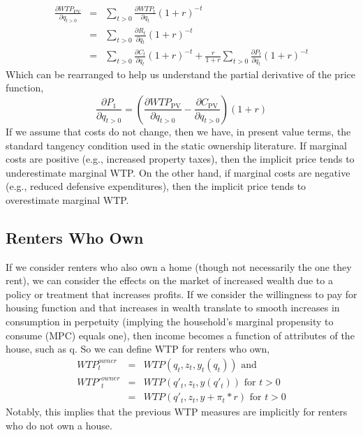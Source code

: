 \documentclass[ecta,nameyear,draft]{econsocart}
\theoremstyle{plain}
\theoremstyle{remark}
\begin{document}
\begin{eqnarray}
\frac{\partial \mathit{WTP}_{\mathrm{PV}}}{\partial q_{t>0}}&=&\sum_{t>0} \frac{\partial \mathit{WTP}_t}{\partial q_t}(1+r)^{-t}\\ \label{pvmwtp}
&=&\sum_{t>0} \frac{\partial R_t}{\partial q_t}(1+r)^{-t}\nonumber\\
&=&\sum_{t>0} \frac{\partial C_t}{\partial q_t}(1+r)^{-t}+\frac{r}{1+r}\sum_{t>0} \frac{\partial P_t}{\partial q_t}(1+r)^{-t}\nonumber
\end{eqnarray}
Which can be rearranged to help us understand the partial derivative of the price function,
\begin{equation}
	\frac{\partial P_1} {\partial q_{t>0}}=\left(\frac{\partial \mathit{WTP}_{\mathrm{PV}}}{\partial q_{t>0}}-\frac{\partial C_{\mathrm{PV}}}{\partial q_{t>0}}\right)(1+r) \label{marginalPrice}
\end{equation}
If we assume that costs do not change, then we have, in present value terms, the standard tangency condition used in the static ownership literature. If marginal costs are positive (e.g., increased property taxes), then the implicit price tends to underestimate marginal WTP. On the other hand, if marginal costs are negative (e.g., reduced defensive expenditures), then the implicit price tends to overestimate marginal WTP.

\subsection{Renters Who Own}
If we consider renters who also own a home (though not necessarily the one they rent), we can consider the effects on the market of increased wealth due to a policy or treatment that increases profits. If we consider the willingness to pay for housing function and that increases in wealth translate to smooth increases in consumption in perpetuity (implying the household's marginal propensity to consume (MPC) equals one), then income becomes a function of attributes of the house, such as q. So we can define WTP for renters who own,
\begin{eqnarray*}	
	\mathit{WTP}_t^{\mathit{owner}}&=&\mathit{WTP}(q_t,z_t,y_t(q_t)) \text{ and} \\
	\mathit{WTP'}_t^{\mathit{owner}}&=&\mathit{WTP}(q'_t,z_t,y(q'_t)) \text{ for } t>0\\
	&=&	\mathit{WTP}(q'_t,z_t,y+\pi_t*r) \text{ for } t>0
\end{eqnarray*}
Notably, this implies that the previous WTP measures are implicitly for renters who do not own a house.
\end{document}
